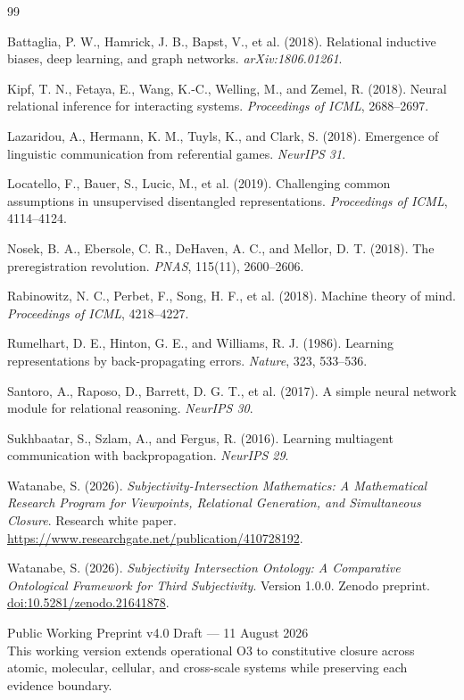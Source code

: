 \documentclass[11pt,a4paper]{article}
\begin{document}
\renewcommand{\refname}{Selected references}
\begin{thebibliography}{99}

Battaglia, P. W., Hamrick, J. B., Bapst, V., et al. (2018). Relational inductive biases, deep learning, and graph networks. \emph{arXiv:1806.01261}.

Kipf, T. N., Fetaya, E., Wang, K.-C., Welling, M., and Zemel, R. (2018). Neural relational inference for interacting systems. \emph{Proceedings of ICML}, 2688--2697.

Lazaridou, A., Hermann, K. M., Tuyls, K., and Clark, S. (2018). Emergence of linguistic communication from referential games. \emph{NeurIPS 31}.

Locatello, F., Bauer, S., Lucic, M., et al. (2019). Challenging common assumptions in unsupervised disentangled representations. \emph{Proceedings of ICML}, 4114--4124.

Nosek, B. A., Ebersole, C. R., DeHaven, A. C., and Mellor, D. T. (2018). The preregistration revolution. \emph{PNAS}, 115(11), 2600--2606.

Rabinowitz, N. C., Perbet, F., Song, H. F., et al. (2018). Machine theory of mind. \emph{Proceedings of ICML}, 4218--4227.

Rumelhart, D. E., Hinton, G. E., and Williams, R. J. (1986). Learning representations by back-propagating errors. \emph{Nature}, 323, 533--536.

Santoro, A., Raposo, D., Barrett, D. G. T., et al. (2017). A simple neural network module for relational reasoning. \emph{NeurIPS 30}.

Sukhbaatar, S., Szlam, A., and Fergus, R. (2016). Learning multiagent communication with backpropagation. \emph{NeurIPS 29}.

Watanabe, S. (2026). \emph{Subjectivity-Intersection Mathematics: A Mathematical Research Program for Viewpoints, Relational Generation, and Simultaneous Closure}. Research white paper. \url{https://www.researchgate.net/publication/410728192}.

Watanabe, S. (2026). \emph{Subjectivity Intersection Ontology: A Comparative Ontological Framework for Third Subjectivity}. Version 1.0.0. Zenodo preprint. \href{https://doi.org/10.5281/zenodo.21641878}{doi:10.5281/zenodo.21641878}.

\end{thebibliography}

\vfill
\begin{center}
\small\sffamily
Public Working Preprint v4.0 Draft --- 11 August 2026\\
This working version extends operational O3 to constitutive closure across atomic, molecular, cellular, and cross-scale systems while preserving each evidence boundary.
\end{center}
\end{document}
